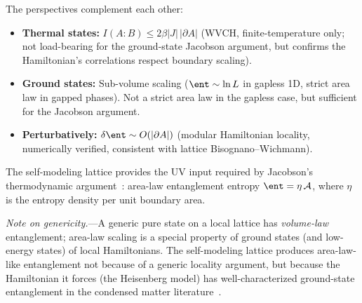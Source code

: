The perspectives complement each other:
\begin{itemize}
\item \textbf{Thermal states:} $I(A{:}B) \leq 2\beta|J|\,|\partial A|$
  (WVCH, finite-temperature only; not load-bearing for the ground-state
  Jacobson argument, but confirms the Hamiltonian's correlations respect
  boundary scaling).
\item \textbf{Ground states:} Sub-volume scaling
  ($\ent \sim \ln L$ in gapless 1D, strict area law in gapped phases).
  Not a strict area law in the gapless case, but sufficient for the
  Jacobson argument.
\item \textbf{Perturbatively:}
  $\delta\ent \sim O(|\partial A|)$ (modular Hamiltonian locality,
  numerically verified, consistent with lattice Bisognano--Wichmann).
\end{itemize}
The self-modeling lattice provides the UV input required by Jacobson's
thermodynamic argument~\cite{Jacobson1995}: area-law entanglement
entropy $\ent = \eta\,\mathcal{A}$, where $\eta$ is the entropy density
per unit boundary area.

\emph{Note on genericity.}---A generic pure state on a local lattice
has \emph{volume-law} entanglement; area-law scaling is a special
property of ground states (and low-energy states) of local
Hamiltonians.  The self-modeling lattice produces area-law-like
entanglement not because of a generic locality argument, but because
the Hamiltonian it forces (the Heisenberg model) has well-characterized
ground-state entanglement in the condensed matter
literature~\cite{EisertCramerPlenio2010}.
